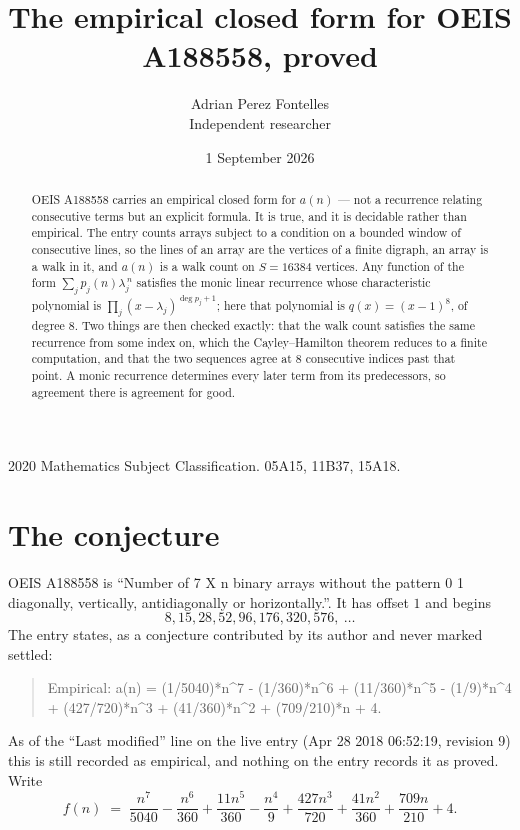\documentclass[11pt,a4paper]{article}
\title{The empirical closed form for OEIS A188558, proved}
\author{Adrian Perez Fontelles\\ \small Independent researcher}
\date{1 September 2026}
\theoremstyle{plain}
\theoremstyle{definition}
\begin{document}
\maketitle

\begin{abstract}
OEIS A188558 carries an empirical closed form for $a(n)$ --- not a recurrence relating
consecutive terms but an explicit formula. It is true, and it is decidable rather than
empirical. The entry counts arrays subject to a condition on a bounded window of consecutive lines, so the lines of an array are the
vertices of a finite digraph, an array is a walk in it, and $a(n)$ is a walk count on
$S=16384$ vertices. Any function of the form $\sum_j p_j(n)\lambda_j^{\,n}$ satisfies the
monic linear recurrence whose characteristic polynomial is
$\prod_j(x-\lambda_j)^{\deg p_j+1}$; here that polynomial is $q(x)=(x-1)^{8}$, of degree
$8$. Two things are then checked exactly: that the walk count satisfies the same
recurrence from some index on, which the Cayley--Hamilton theorem reduces to a finite
computation, and that the two sequences agree at $8$ consecutive indices past that
point. A monic recurrence determines every later term from its predecessors, so agreement
there is agreement for good.
\end{abstract}

\noindent\small 2020 Mathematics Subject Classification. 05A15, 11B37, 15A18.\normalsize

\section{The conjecture}

OEIS A188558 is ``Number of 7 X n binary arrays without the pattern 0 1 diagonally, vertically, antidiagonally or horizontally.''. It has offset $1$ and begins
\[
8, 15, 28, 52, 96, 176, 320, 576,\ \dots
\]
The entry states, as a conjecture contributed by its author and never marked settled:
\begin{quote}
Empirical: a(n) = (1/5040)*n\^{}7 - (1/360)*n\^{}6 + (11/360)*n\^{}5 - (1/9)*n\^{}4 + (427/720)*n\^{}3 + (41/360)*n\^{}2 + (709/210)*n + 4.
\end{quote}
As of the ``Last modified'' line on the live entry (Apr 28 2018 06:52:19, revision 9) this is still
recorded as empirical, and nothing on the entry records it as proved. Write
\[
f(n)\;=\;\frac{n^{7}}{5040} - \frac{n^{6}}{360} + \frac{11 n^{5}}{360} - \frac{n^{4}}{9} + \frac{427 n^{3}}{720} + \frac{41 n^{2}}{360} + \frac{709 n}{210} + 4.
\]
\end{document}
